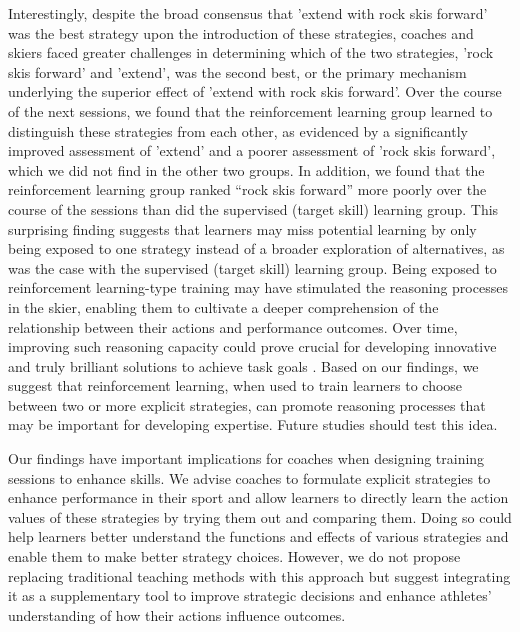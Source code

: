 \documentclass[pdflatex,sn-nature]{sn-jnl}%
\theoremstyle{thmstyleone}%
\theoremstyle{thmstyletwo}%
\theoremstyle{thmstylethree}%
\begin{document}
Interestingly, despite the broad consensus that 'extend with rock skis forward' was the best strategy upon the introduction of these strategies, coaches and skiers faced greater challenges in determining which of the two strategies, 'rock skis forward' and 'extend', was the second best, or the primary mechanism underlying the superior effect of 'extend with rock skis forward'. Over the course of the next sessions, we found that the reinforcement learning group learned to distinguish these strategies from each other, as evidenced by a significantly improved assessment of 'extend' and a poorer assessment of 'rock skis forward', which we did not find in the other two groups. In addition, we found that the reinforcement learning group ranked “rock skis forward” more poorly over the course of the sessions than did the supervised (target skill) learning group. This surprising finding suggests that learners may miss potential learning by only being exposed to one strategy instead of a broader exploration of alternatives, as was the case with the supervised (target skill) learning group. Being exposed to reinforcement learning-type training may have stimulated the reasoning processes in the skier, enabling them to cultivate a deeper comprehension of the relationship between their actions and performance outcomes\cite{tsay_strategy_2023}. Over time, improving such reasoning capacity could prove crucial for developing innovative and truly brilliant solutions to achieve task goals  \cite{ericsson_scientific_1998}. Based on our findings, we suggest that reinforcement learning, when used to train learners to choose between two or more explicit strategies, can promote reasoning processes that may be important for developing expertise. Future studies should test this idea.

Our findings have important implications for coaches when designing training sessions to enhance skills. We advise coaches to formulate explicit strategies to enhance performance in their sport and allow learners to directly learn the action values of these strategies by trying them out and comparing them. Doing so could help learners better understand the functions and effects of various strategies and enable them to make better strategy choices. However, we do not propose replacing traditional teaching methods with this approach but suggest integrating it as a supplementary tool to improve strategic decisions and enhance athletes’ understanding of how their actions influence outcomes. 
\end{document}

